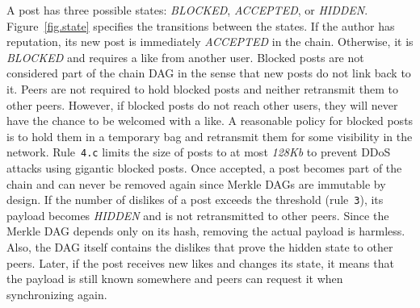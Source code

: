 \documentclass[10pt,journal,compsoc]{IEEEtran}
\begin{document}
A post has three possible states: \emph{BLOCKED}, \emph{ACCEPTED}, or
\emph{HIDDEN}.
Figure~\ref{fig.state} specifies the transitions between the states.
%
If the author has reputation, its new post is immediately \emph{ACCEPTED} in
the chain.
Otherwise, it is \emph{BLOCKED} and requires a like from another user.
Blocked posts are not considered part of the chain DAG in the sense that new
posts do not link back to it.
%
Peers are not required to hold blocked posts and neither retransmit them to
other peers.
However, if blocked posts do not reach other users, they will never have the
chance to be welcomed with a like.
A reasonable policy for blocked posts is to hold them in a temporary bag and
retransmit them for some visibility in the network.
Rule~\texttt{4.c} limits the size of posts to at most \emph{128Kb} to prevent
DDoS attacks using gigantic blocked posts.
%
Once accepted, a post becomes part of the chain and can never be removed
again since Merkle DAGs are immutable by design.
%
If the number of dislikes of a post exceeds the threshold (rule~\texttt{3}),
its payload becomes \emph{HIDDEN} and is not retransmitted to other peers.
Since the Merkle DAG depends only on its hash, removing the actual payload is
harmless.
Also, the DAG itself contains the dislikes that prove the hidden state to other
peers.
Later, if the post receives new likes and changes its state, it means that the
payload is still known somewhere and peers can request it when synchronizing
again.


\end{document}
